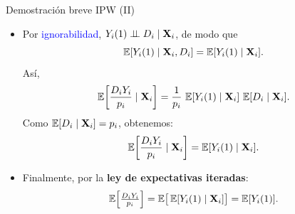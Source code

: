 \documentclass[10pt, xcolor=dvipsnames]{beamer}
\begin{document}
\begin{frame}{Demostración breve IPW (II)}
\begin{itemize}
\item Por \textcolor{blue}{ignorabilidad}, $Y_i(1)\perp \!\!\! \perp D_i \mid \textbf{X}_i$, de modo que
    \[
    \operatorname{\mathbb{E}}[Y_i(1)\mid \textbf{X}_i,D_i] = \operatorname{\mathbb{E}}[Y_i(1)\mid \textbf{X}_i].
    \]
    Así,
    \[
    \operatorname{\mathbb{E}}\!\left[\frac{D_i Y_i}{p_i} \mid \textbf{X}_i\right] 
    = \frac{1}{p_i}\,\operatorname{\mathbb{E}}[Y_i(1)\mid \textbf{X}_i]\,\operatorname{\mathbb{E}}[D_i\mid \textbf{X}_i].
    \]
    Como $\operatorname{\mathbb{E}}[D_i\mid \textbf{X}_i]=p_i$, obtenemos:
    \[
    \operatorname{\mathbb{E}}\!\left[\frac{D_i Y_i}{p_i} \mid \textbf{X}_i\right] 
    = \operatorname{\mathbb{E}}[Y_i(1)\mid \textbf{X}_i].
    \]
    
    \item Finalmente, por la \textbf{ley de expectativas iteradas}:
    \[
    \operatorname{\mathbb{E}}\!\left[\tfrac{D_i Y_i}{p_i}\right] 
    = \operatorname{\mathbb{E}}\!\big[\operatorname{\mathbb{E}}[Y_i(1)\mid \textbf{X}_i]\big] 
    = \operatorname{\mathbb{E}}[Y_i(1)].
    \]
\end{itemize}
\hyperlink{DIAP:DEMOS}{{}}
\end{frame}




\end{document}
